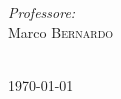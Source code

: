 \documentclass[11pt, a4paper, titlepage, block]{article}
\begin{document}
\begin{titlepage}
		\begin{minipage}{\textwidth}
			\begin{flushright}
				\emph{Professore:} \\
				Marco \textsc{Bernardo}\\ %
			\end{flushright}
		\end{minipage}\\[4cm]

		{\today}\\[1cm]


		
		\newpage
		\tableofcontents
		\newpage
		
	\end{titlepage}
	
\end{document}
